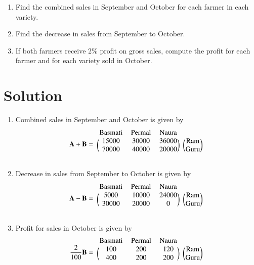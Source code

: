 \documentclass[journal,12pt,twocolumn]{IEEEtran}
\begin{document}
\begin{enumerate}
    \item Find the combined sales in September and October for each farmer in each variety.
    \item Find the decrease in sales from September to October.
    \item If both farmers receive 2\% profit on gross sales, compute the profit for each farmer and for each variety sold in October.
\end{enumerate}
%
\section{Solution}
%
\begin{enumerate}
    \item Combined sales in September and October is given by
    \begin{align}
    \vec{A}+\vec{B}=
    \begin{blockarray}{cccc}
    \text{Basmati} & \text{Permal} & \text{Naura} \\
    \begin{block}{(ccc)(c)}
    15000 & 30000 & 36000 & \text{Ram}\\
    70000 & 40000 & 20000 & \text{Guru} \\
    \end{block}
    \end{blockarray}
    \end{align}

    \item Decrease in sales from September to October is given by
    \begin{align}
    \vec{A}-\vec{B}=
    \begin{blockarray}{cccc}
    \text{Basmati} & \text{Permal} & \text{Naura} \\
    \begin{block}{(ccc)(c)}
    5000 & 10000 & 24000 & \text{Ram}\\
    30000 & 20000 & 0 & \text{Guru} \\
    \end{block}
    \end{blockarray}
    \end{align}
    
    \item Profit for sales in October is given by
    \begin{align}
    \frac{2}{100}\vec{B} =
    \begin{blockarray}{cccc}
    \text{Basmati} & \text{Permal} & \text{Naura} \\
    \begin{block}{(ccc)(c)}
    100 & 200 & 120 & \text{Ram}\\
    400 & 200 & 200 & \text{Guru} \\
    \end{block}
    \end{blockarray}
    \end{align}
    
\end{enumerate}
\end{document}
